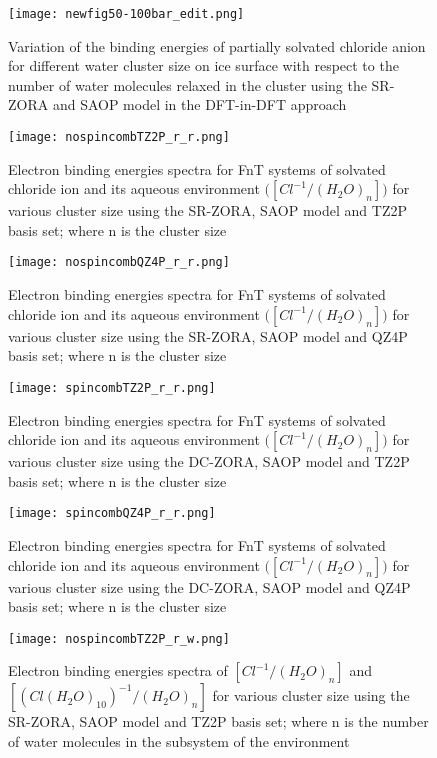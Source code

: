 \documentclass[a4paper,11pt]{report}
\begin{document}
\begin{figure}[H]\large
\texttt{[image: newfig50-100bar\_edit.png]}
\caption{Variation of the binding energies of partially solvated chloride anion for different water cluster size on ice surface with respect to the number of water molecules relaxed in the cluster using the SR-ZORA and SAOP model in the DFT-in-DFT approach}
\label{figure45}
\end{figure}

\begin{figure}[H]\large
\texttt{[image: nospincombTZ2P\_r\_r.png]}
\caption{Electron binding energies spectra for FnT systems of solvated chloride ion and its aqueous environment $\big([Cl^{-1}/(H_{2}O)_{n}]\big)$ for various cluster size using the SR-ZORA, SAOP model and TZ2P basis set; where n is the cluster size}
\label{figure46}
\end{figure}

\begin{figure}[H]\large
\texttt{[image: nospincombQZ4P\_r\_r.png]}
\caption{Electron binding energies spectra for FnT systems of solvated chloride ion and its aqueous environment $\big([Cl^{-1}/(H_{2}O)_{n}]\big)$ for various cluster size using the SR-ZORA, SAOP model and QZ4P basis set; where n is the cluster size}
\label{figure47}
\end{figure}

\begin{figure}[H]\large
\texttt{[image: spincombTZ2P\_r\_r.png]}
\caption{Electron binding energies spectra for FnT systems of solvated chloride ion and its aqueous environment $\big([Cl^{-1}/(H_{2}O)_{n}]\big)$ for various cluster size using the DC-ZORA, SAOP model and TZ2P basis set; where n is the cluster size}
\label{figure48}
\end{figure}

\begin{figure}[H]\large
\texttt{[image: spincombQZ4P\_r\_r.png]}
\caption{Electron binding energies spectra for FnT systems of solvated chloride ion and its aqueous environment $\big([Cl^{-1}/(H_{2}O)_{n}]\big)$ for various cluster size using the DC-ZORA, SAOP model and QZ4P basis set; where n is the cluster size}
\label{figure49}
\end{figure}


\begin{figure}[H]\large
\texttt{[image: nospincombTZ2P\_r\_w.png]}
\caption{Electron binding energies spectra of $[Cl^{-1}/(H_{2}O)_{n}]$ and $[(Cl(H_{2}O)_{10})^{-1}/(H_{2}O)_{n}]$ for various cluster size using the SR-ZORA, SAOP model and TZ2P basis set; where n is the number of water molecules in the subsystem of the environment}
\label{figure50}
\end{figure}
\end{document}
